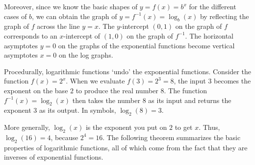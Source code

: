\documentclass{ximera}
\begin{document}
 

Moreover, since we know the basic shapes of $y = f(x) = b^{x}$ for the different cases of $b$, we can obtain the graph of $y = f^{-1}(x) = \log_{b}(x)$ by reflecting the graph of $f$ across the line $y=x$.  The $y$-intercept $(0,1)$ on the graph of $f$  corresponds to an $x$-intercept of $(1,0)$ on the graph of $f^{-1}$.  The horizontal asymptotes $y=0$ on the graphs of the exponential functions become vertical asymptotes $x=0$ on the log graphs.  


\begin{center}
\end{center}

Procedurally,  logarithmic functions  `undo' the exponential functions.  Consider the function $f(x) = 2^{x}$.  When we evaluate $f(3) = 2^{3} = 8$, the input $3$ becomes the exponent on the base $2$ to produce the real number $8$.  The function $f^{-1}(x) = \log_{2}(x)$ then takes the number $8$ as its input and returns the exponent $3$ as its output.  In symbols, $\log_{2}(8) = 3$. 

 

More generally, $\log_{2}(x)$ is the exponent you put on $2$ to get $x$.  Thus, $\log_{2}(16) = 4$, because $2^{4} = 16$.  The following theorem summarizes the basic properties of logarithmic functions, all of which come from the fact that they are inverses of exponential functions. 
 

\end{document}
